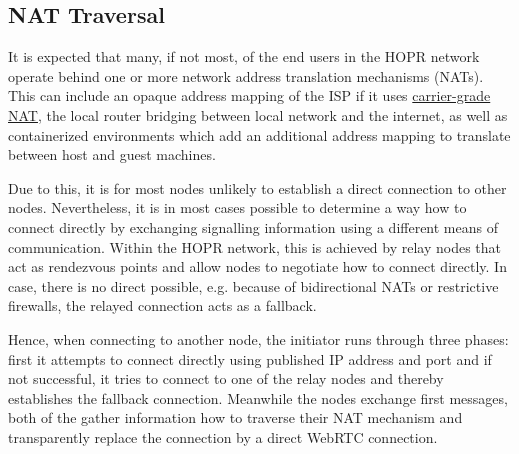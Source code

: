 \subsection{NAT Traversal}
\label{sec:p2p:nat-traversal}

It is expected that many, if not most, of the end users in the HOPR network operate behind one or more network address translation mechanisms (NATs). This can include an opaque address mapping of the ISP if it uses \href{https://en.wikipedia.org/wiki/Carrier-grade_NAT}{carrier-grade NAT}, the local router bridging between local network and the internet, as well as containerized environments which add an additional address mapping to translate between host and guest machines.

Due to this, it is for most nodes unlikely to establish a direct connection to other nodes. Nevertheless, it is in most cases possible to determine a way how to connect directly by exchanging signalling information using a different means of communication. Within the HOPR network, this is achieved by relay nodes that act as rendezvous points and allow nodes to negotiate how to connect directly. In case, there is no direct possible, e.g. because of bidirectional NATs or restrictive firewalls, the relayed connection acts as a fallback.

Hence, when connecting to another node, the initiator runs through three phases: first it attempts to connect directly using published IP address and port and if not successful, it tries to connect to one of the relay nodes and thereby establishes the fallback connection. Meanwhile the nodes exchange first messages, both of the gather information how to traverse their NAT mechanism and transparently replace the connection by a direct WebRTC connection.

